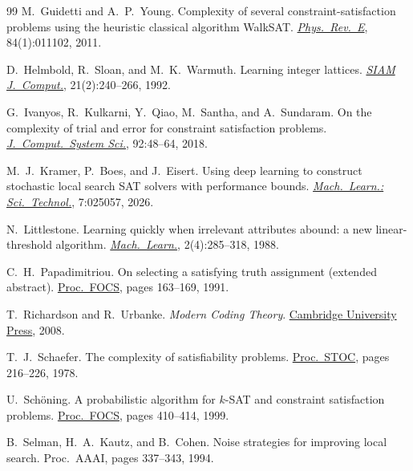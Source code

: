 \documentclass[11pt,a4paper]{article}
\theoremstyle{definition}
\theoremstyle{remark}
\begin{document}
\begin{thebibliography}{99}
M.~Guidetti and A.~P.~Young.
\newblock Complexity of several constraint-satisfaction problems using the heuristic classical algorithm WalkSAT.
\newblock \href{https://doi.org/10.1103/PhysRevE.84.011102}{\emph{Phys.\ Rev.\ E}}, 84(1):011102, 2011.

D.~Helmbold, R.~Sloan, and M.~K.~Warmuth.
\newblock Learning integer lattices.
\newblock \href{https://doi.org/10.1137/0221019}{\emph{SIAM J.\ Comput.}}, 21(2):240--266, 1992.

G.~Ivanyos, R.~Kulkarni, Y.~Qiao, M.~Santha, and A.~Sundaram.
\newblock On the complexity of trial and error for constraint satisfaction problems.
\newblock \href{https://doi.org/10.1016/j.jcss.2017.07.005}{\emph{J.\ Comput.\ System Sci.}}, 92:48--64, 2018.

M.~J.~Kramer, P.~Boes, and J.~Eisert.
\newblock Using deep learning to construct stochastic local search SAT solvers with performance bounds.
\newblock \href{https://doi.org/10.1088/2632-2153/ae5b23}{\emph{Mach.\ Learn.: Sci.\ Technol.}}, 7:025057, 2026.

N.~Littlestone.
\newblock Learning quickly when irrelevant attributes abound: a new linear-threshold algorithm.
\newblock \href{https://doi.org/10.1007/BF00116827}{\emph{Mach.\ Learn.}}, 2(4):285--318, 1988.

C.~H.~Papadimitriou.
\newblock On selecting a satisfying truth assignment (extended abstract).
\newblock \href{https://doi.org/10.1109/SFCS.1991.185365}{Proc.\ FOCS}, pages 163--169, 1991.

T.~Richardson and R.~Urbanke.
\newblock \emph{Modern Coding Theory}.
\newblock \href{https://doi.org/10.1017/CBO9780511791338}{Cambridge University Press}, 2008.

T.~J.~Schaefer.
\newblock The complexity of satisfiability problems.
\newblock \href{https://doi.org/10.1145/800133.804350}{Proc.\ STOC}, pages 216--226, 1978.

U.~Sch\"oning.
\newblock A probabilistic algorithm for $k$-SAT and constraint satisfaction problems.
\newblock \href{https://doi.org/10.1109/SFFCS.1999.814612}{Proc.\ FOCS}, pages 410--414, 1999.

B.~Selman, H.~A.~Kautz, and B.~Cohen.
\newblock Noise strategies for improving local search.
\newblock Proc.\ AAAI, pages 337--343, 1994.


\end{thebibliography}
\end{document}
